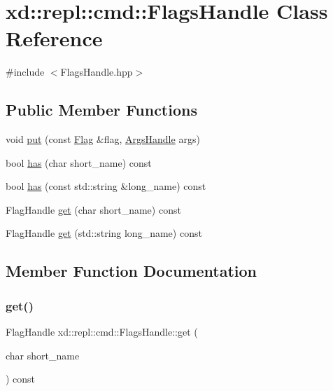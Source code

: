 \hypertarget{classxd_1_1repl_1_1cmd_1_1_flags_handle}{}\section{xd\+:\+:repl\+:\+:cmd\+:\+:Flags\+Handle Class Reference}
\label{classxd_1_1repl_1_1cmd_1_1_flags_handle}


{\ttfamily \#include $<$Flags\+Handle.\+hpp$>$}

\subsection*{Public Member Functions}
\begin{DoxyCompactItemize}
\item 
void \mbox{\hyperlink{classxd_1_1repl_1_1cmd_1_1_flags_handle_afc48e6f51b5caf0c09b95dc8dcca5aee}{put}} (const \mbox{\hyperlink{classxd_1_1repl_1_1cmd_1_1_flag}{Flag}} \&flag, \mbox{\hyperlink{classxd_1_1repl_1_1cmd_1_1_args_handle}{Args\+Handle}} args)
\item 
bool \mbox{\hyperlink{classxd_1_1repl_1_1cmd_1_1_flags_handle_ac3ad020f77409cf74fd188cdf06ad427}{has}} (char short\+\_\+name) const
\item 
bool \mbox{\hyperlink{classxd_1_1repl_1_1cmd_1_1_flags_handle_a39a90e14bf6b1d71e4356a1c81dbb315}{has}} (const std\+::string \&long\+\_\+name) const
\item 
Flag\+Handle \mbox{\hyperlink{classxd_1_1repl_1_1cmd_1_1_flags_handle_abff9ddfaec169cb2aad2eab92c15de1e}{get}} (char short\+\_\+name) const
\item 
Flag\+Handle \mbox{\hyperlink{classxd_1_1repl_1_1cmd_1_1_flags_handle_a6f30d0b37e7c9cb5f9f9feafdd261711}{get}} (std\+::string long\+\_\+name) const
\end{DoxyCompactItemize}


\subsection{Member Function Documentation}
\mbox{\label{classxd_1_1repl_1_1cmd_1_1_flags_handle_abff9ddfaec169cb2aad2eab92c15de1e}} 
\subsubsection{\texorpdfstring{get()}{get()}\hspace{0.1cm}{\footnotesize\ttfamily [1/2]}}
{\footnotesize\ttfamily Flag\+Handle xd\+::repl\+::cmd\+::\+Flags\+Handle\+::get (\begin{DoxyParamCaption}\item[{char}]{short\+\_\+name }\end{DoxyParamCaption}) const\hspace{0.3cm}{\ttfamily [inline]}}

